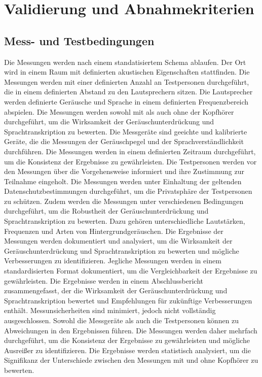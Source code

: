 \documentclass{article}
\begin{document}
\section{Validierung und Abnahmekriterien}

    \subsection{Mess- und Testbedingungen}
    Die Messungen werden nach einem standatisiertem Schema ablaufen. Der Ort wird in einem Raum mit definierten akustischen Eigenschaften stattfinden. Die Messungen werden mit einer definierten Anzahl an Testpersonen durchgeführt, die in einem definierten Abstand zu den Lautsprechern sitzen. Die Lautsprecher werden definierte Geräusche und Sprache in einem definierten Frequenzbereich abspielen. Die Messungen werden sowohl mit als auch ohne der Kopfhörer durchgeführt, um die Wirksamkeit der Geräuschunterdrückung und Sprachtranskription zu bewerten. 
    Die Messgeräte sind geeichte und kalibrierte Geräte, die die Messungen der Geräuschpegel und der Sprachverständlichkeit durchführen. Die Messungen werden in einem definierten Zeitraum durchgeführt, um die Konsistenz der Ergebnisse zu gewährleisten. Die Testpersonen werden vor den Messungen über die Vorgehensweise informiert und ihre Zustimmung zur Teilnahme eingeholt. Die Messungen werden unter Einhaltung der geltenden Datenschutzbestimmungen durchgeführt, um die Privatsphäre der Testpersonen zu schützen.
    Zudem werden die Messungen unter verschiedenen Bedingungen durchgeführt, um die Robustheit der Geräuschunterdrückung und Sprachtranskription zu bewerten. Dazu gehören unterschiedliche Lautstärken, Frequenzen und Arten von Hintergrundgeräuschen. Die Ergebnisse der Messungen werden dokumentiert und analysiert, um die Wirksamkeit der Geräuschunterdrückung und Sprachtranskription zu bewerten und mögliche Verbesserungen zu identifizieren.
    Jegliche Messungen werden in einem standardisierten Format dokumentiert, um die Vergleichbarkeit der Ergebnisse zu gewährleisten. Die Ergebnisse werden in einem Abschlussbericht zusammengefasst, der die Wirksamkeit der Geräuschunterdrückung und Sprachtranskription bewertet und Empfehlungen für zukünftige Verbesserungen enthält.
    Messunsicherheiten sind minimiert, jedoch nicht vollständig ausgeschlossen. Sowohl die Messgeräte als auch die Testpersonen können zu Abweichungen in den Ergebnissen führen. Die Messungen werden daher mehrfach durchgeführt, um die Konsistenz der Ergebnisse zu gewährleisten und mögliche Ausreißer zu identifizieren. Die Ergebnisse werden statistisch analysiert, um die Signifikanz der Unterschiede zwischen den Messungen mit und ohne Kopfhörer zu bewerten. 
\end{document}

